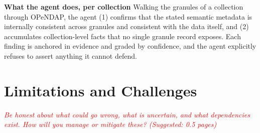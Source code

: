 \documentclass[11pt]{article}
\begin{document}
\textbf{What the agent does, per collection} Walking the granules of a collection through \ac{OPeNDAP}, the agent (1) confirms that the stated semantic metadata is internally consistent across granules and consistent with the data itself, and (2) accumulates collection-level facts that no single granule record exposes. Each finding is anchored in evidence and graded by confidence, and the agent explicitly refuses to assert anything it cannot defend.





\section{Limitations and Challenges}
\textcolor{red}{\textit{Be honest about what could go wrong, what is uncertain, and what dependencies exist. How will you manage or mitigate these? (Suggested: 0.5 pages)}}
\end{document}
